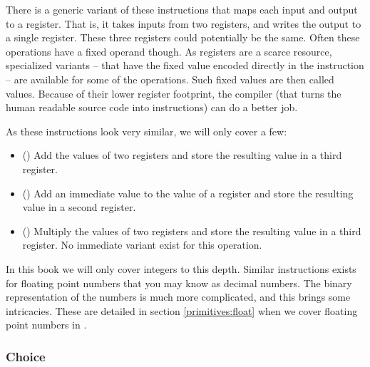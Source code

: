 There is a generic variant of these instructions that maps each input and output to a register. That is, it takes inputs from two registers, and writes the output to a single register. These three registers could potentially be the same. Often these operations have a fixed operand though. As registers are a scarce resource, specialized variants -- that have the fixed value encoded directly in the instruction -- are available for some of the operations. Such fixed values are then called  values. Because of their lower register footprint, the compiler (that turns the human readable source code into instructions) can do a better job.

As these instructions look very similar, we will only cover a few:
\begin{itemize}
  \item {} () Add the values of two registers and store the resulting value in a third register.
  \item {} () Add an immediate value to the value of a register and store the resulting value in a second register.
  \item {} () Multiply the values of two registers and store the resulting value in a third register. No immediate variant exist for this operation.
\end{itemize}

In this book we will only cover integers to this depth. Similar instructions exists for floating point numbers that you may know as decimal numbers. The binary representation of the numbers is much more complicated, and this brings some intricacies. These are detailed in section \ref{primitives:float} when we cover floating point numbers in \csharp.

\subsubsection{Choice}
\label{sec:machine:inst:choice}

